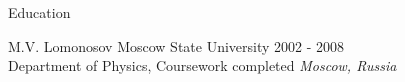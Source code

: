 \documentclass{resume} %
\begin{document}

\begin{rSection}{Education}

M.V. Lomonosov Moscow State University \hfill {2002 - 2008}\\
Department of Physics, Coursework completed \hfill \textit{Moscow, Russia}

\end{rSection}
\end{document}
